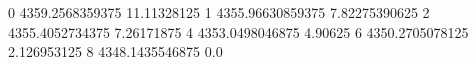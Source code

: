 0 4359.2568359375 11.11328125
1 4355.96630859375 7.82275390625
2 4355.4052734375 7.26171875
4 4353.0498046875 4.90625
6 4350.2705078125 2.126953125
8 4348.1435546875 0.0
